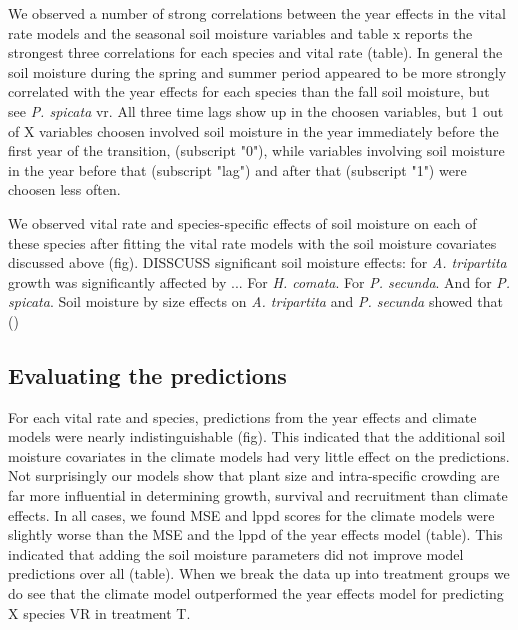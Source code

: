 \documentclass[11pt]{article}
\begin{document}
\begin{doublespacing}
We observed a number of strong correlations between the year effects in the vital rate models and the seasonal soil moisture variables and table x reports the strongest three correlations for each species and vital rate (table). In general the soil moisture during the spring and summer period appeared to be more strongly correlated with the year effects for each species than the fall soil moisture, but see \textit{P. spicata} vr.  All three time lags show up in the choosen variables, but 1 out of X variables choosen involved soil moisture in the year immediately before the first year of the transition, (subscript "0"), while variables involving soil moisture in the year before that (subscript "lag") and after that (subscript "1") were choosen less often.

We observed vital rate and species-specific effects of soil moisture on each of these species after fitting the vital rate models with the soil moisture covariates discussed above (fig). DISSCUSS significant soil moisture effects: for \textit{A. tripartita} growth was significantly affected by ...  For \textit{H. comata}.  For \textit{P. secunda}. And for \textit{P. spicata}. Soil moisture by size effects on \textit{A. tripartita} and \textit{P. secunda} showed that ()

\subsection*{Evaluating the predictions}

For each vital rate and species, predictions from the year effects and climate models were nearly indistinguishable (fig). This indicated that the additional soil moisture covariates in the climate models had very little effect on the predictions. Not surprisingly \citep{chu_direct_2016,treddenick_} our models show that plant size and intra-specific crowding are far more influential in determining growth, survival and recruitment than climate effects.  In all cases, we found MSE and lppd scores for the climate models were slightly worse than the MSE and the lppd of the year effects model (table).  This indicated that adding the soil moisture parameters did not improve model predictions over all (table). When we break the data up into treatment groups we do see that the climate model outperformed the year effects model for predicting X species VR in treatment T.    


\end{doublespacing}
\end{document}

